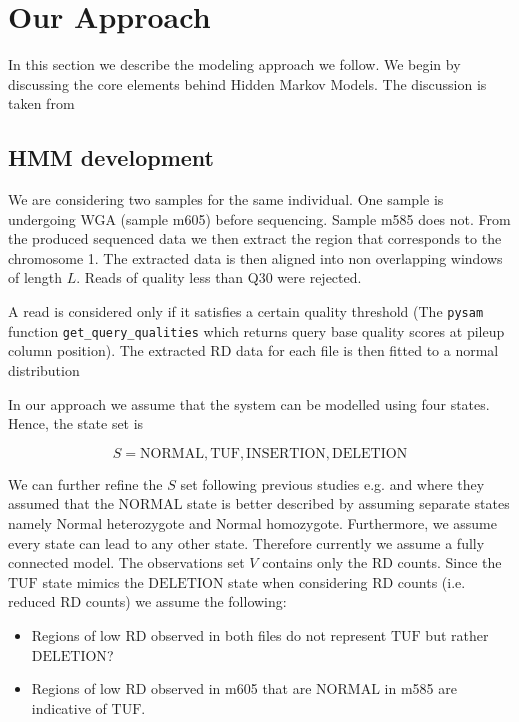 \section{Our Approach}
In this section we describe the modeling approach we follow.
We begin by discussing the core elements behind Hidden Markov Models.
The discussion is taken from \cite{rabiner2009}

\subsection{HMM development}
\label{hmm_dev}

We are considering two samples for the same individual. One sample is undergoing WGA (sample m605) before sequencing. Sample m585 does not. From the produced sequenced data we then extract the region that corresponds to the chromosome 1. The extracted data is then aligned into non overlapping windows 
of length $L$. Reads of quality less than Q30 were rejected. 



A read is considered only if it satisfies a certain
quality threshold (The \texttt{pysam} function \texttt{get_query_qualities} which returns query base quality scores at pileup column position). The extracted RD data for each file is then fitted to a normal distribution
  
In our approach we assume that the system can be modelled using four states. Hence, the state set is

\begin{equation}
S = {\text{NORMAL}, \text{TUF}, \text{INSERTION}, \text{DELETION}}
\end{equation}

We can further refine the $S$ set following previous studies e.g.
\cite{coella2007} and \cite{Wang2007} where they assumed that the
$\text{NORMAL}$ state is better described by assuming separate states namely Normal heterozygote and Normal homozygote. 
Furthermore, we assume every state can lead to any other state.
Therefore currently we assume a fully connected model.
The observations set $V$ contains only the RD counts. Since the $\text{TUF}$ state mimics the $\text{DELETION}$ state when considering RD counts (i.e. reduced RD counts) we assume the following:

\begin{itemize}
	\item Regions of low RD observed in both files do not represent $\text{TUF}$ but rather $\text{DELETION}$?
	\item Regions of low RD observed in m605 that are $\text{NORMAL}$ in m585 are indicative of $\text{TUF}$.
\end{itemize}  

